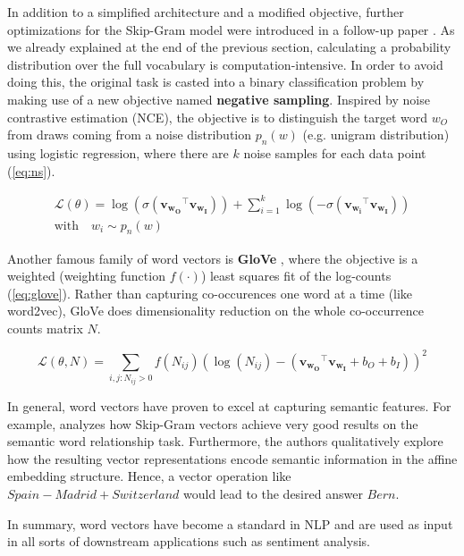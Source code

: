 In addition to a simplified architecture and a modified objective, further optimizations for the Skip-Gram model were introduced in a follow-up paper \cite{mikolov2013distributed}. As we already explained at the end of the previous section, calculating a probability distribution over the full vocabulary is computation-intensive. In order to avoid doing this, the original task is casted into a binary classification problem by making use of a new objective named \textbf{negative sampling}. Inspired by noise contrastive estimation (NCE), the objective is to distinguish the target word $w_O$ from draws coming from a noise distribution $p_n(w)$ (e.g. unigram distribution) using logistic regression, where there are $k$ noise samples for each data point (\autoref{eq:ns}).

\begin{equation} \label{eq:ns}
	\begin{gathered}
		\mathcal{L}(\theta) = \log(\sigma(\mathbf{v_{w_O}}^{\top} \mathbf{v_{w_I}})) + \sum_{i=1}^{k} \log(-\sigma(\mathbf{v_{w_i}}^{\top} \mathbf{v_{w_I}})) \\ 
		\text{with} \quad w_i \sim p_n(w)
	\end{gathered}
\end{equation}

Another famous family of word vectors is \textbf{GloVe} \cite{pennington2014glove}, where the objective is a weighted (weighting function $f(\cdot)$) least squares fit of the log-counts (\autoref{eq:glove}). Rather than capturing co-occurences one word at a time (like word2vec), GloVe does dimensionality reduction on the whole co-occurrence counts matrix $N$. 

\begin{equation} \label{eq:glove}
	\mathcal{L}(\theta, N) = \sum_{i,j:N_{ij}>0}f(N_{ij})(\log(N_{ij})-(\mathbf{v_{w_O}}^{\top} \mathbf{v_{w_I}} + b_O + b_I))^2
\end{equation}

In general, word vectors have proven to excel at capturing semantic features. For example, \cite{mikolov2013efficient} analyzes how Skip-Gram vectors achieve very good results on the semantic word relationship task. Furthermore, the authors qualitatively explore how the resulting vector representations encode semantic information in the affine embedding structure. Hence, a vector operation like $\textit{Spain}-\textit{Madrid}+\textit{Switzerland}$ would lead to the desired answer $\textit{Bern}$.

In summary, word vectors have become a standard in NLP and are used as input in all sorts of downstream applications such as sentiment analysis.

